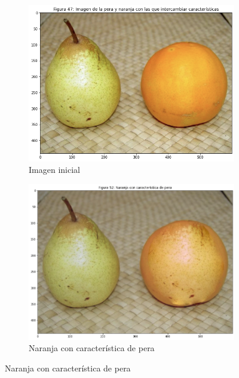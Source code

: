\documentclass[11pt,twoside,titlepage,a4paper]{article}
\numberwithin{equation}{section} %
\theoremstyle{usual}
\begin{document}
\begin{figure}[h]
    \centering
    \begin{subfigure}[t]{.37\textwidth}
        \centering
        \includegraphics[width=\textwidth]{imagenes/PoissonImageEditing_cell_61_output_0.png}
        \caption{Imagen inicial}
        \label{fig:imagenIntercambioCaracterísticas}
    \end{subfigure}
    \centering
    \begin{subfigure}[t]{.37\textwidth}
        \centering
        \includegraphics[width=\textwidth]{imagenes/PoissonImageEditing_cell_61_output_5.png}
        \caption{Naranja con característica de pera}
        \label{fig:naranjaAperada}
    \end{subfigure}

\end{figure}
\end{document}
